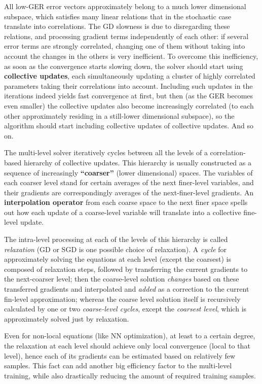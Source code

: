 \documentclass{article} %
\begin{document}
All low-GER error vectors approximately belong to a much lower dimensional subspace, which satisfies many linear relations that in the stochastic case translate into correlations. The GD slowness is due to disregarding these relations, and processing gradient terms independently of each other: if several error terms are strongly correlated, changing one of them without taking into account the changes in the others is very inefficient. To overcome this inefficiency, as soon as the convergence starts slowing down, the solver should start using \textbf{collective updates}, each simultaneously updating a cluster of highly correlated parameters taking their correlations into account. Including such updates in the iterations indeed yields fast convergence at first, but then (as the GER becomes even smaller) the collective updates also become increasingly correlated (to each other approximately residing in a still-lower dimensional subspace), so the algorithm should start including collective updates of collective updates. And so on.
	
The multi-level solver iteratively cycles between all the levels of a correlation-based hierarchy of collective updates. This hierarchy is usually constructed as a sequence of increasingly \textbf{“coarser”} (lower dimensional) spaces. The variables of each coarser level stand for certain averages of the next finer-level variables, and their gradients are correspondingly averages of the next-finer-level gradients. An \textbf{interpolation operator} from each coarse space to the next finer space spells out how each update of a coarse-level variable will translate into a collective fine-level update.

The intra-level processing at each of the levels of this hierarchy is called {\it relaxation} (GD or SGD is one possible choice of relaxation). A {\it cycle} for approximately solving the equations at each level (except the coarsest) is composed of relaxation steps, followed by transferring the current gradients to the next-coarser level; then the coarse-level solution {\it changes} based on these transferred gradients and interpolated and {\it added} as a correction to the current fin-level approximation; whereas the coarse level solution itself is recursively calculated by one or two {\it coarse-level cycles}, except the {\it coarsest level}, which is approximately solved just by relaxation.

Even for non-local equations (like NN optimization), at least to a certain degree, the relaxation at each level should achieve only local convergence (local to that level), hence each of its gradients can be estimated based on relatively few samples. This fact can add another big efficiency factor to the multi-level training, while also drastically reducing the amount of required training samples.
\end{document}
